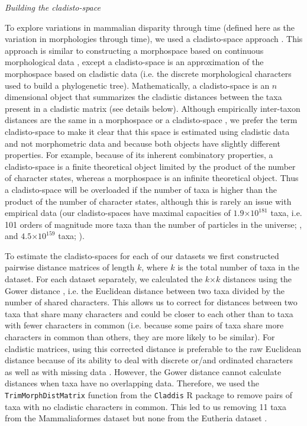 \documentclass[12pt,letterpaper]{article}
\renewcommand{\subsection}[1]{%
\bigskip
\begin{center}
\begin{large}
\normalfont\itshape #1
\end{large}
\end{center}}
\begin{document}
\subsection{Building the cladisto-space}
To explore variations in mammalian disparity through time (defined here as the variation in morphologies through time), we used a cladisto-space approach \citep[e.g.][]{Foote01071994,Foote29111996,Wesley-Hunt2005,Brusatte12092008,friedmanexplosive2010,toljagictriassic-jurassic2013,Hughes20082013}.
This approach is similar to constructing a morphospace based on continuous morphological data \citep[e.g.][]{friedmanexplosive2010}, except a cladisto-space is an approximation of the morphospace based on cladistic data (i.e. the discrete morphological characters used to build a phylogenetic tree).
Mathematically, a cladisto-space is an $n$ dimensional object that summarizes the cladistic distances between the taxa present in a cladistic matrix (see details below).
Although empirically inter-taxon distances are the same in a morphospace or a cladisto-space \citep{foth2012different,hetherington2015cladistic}, we prefer the term cladisto-space to make it clear that this space is estimated using cladistic data and not morphometric data and because both objects have slightly different properties.
For example, because of its inherent combinatory properties, a cladisto-space is a finite theoretical object limited by the product of the number of character states, whereas a morphospace is an infinite theoretical object.
Thus a cladisto-space will be overloaded if the number of taxa is higher than the product of the number of character states, although this is rarely an issue with empirical data (our cladisto-spaces have maximal capacities of $1.9$$\times$$10^{181}$ taxa, i.e. 101 orders of magnitude more taxa than the number of particles in the universe; \citealp{Slater2012MEE}, and $4.5$$\times$$10^{159}$ taxa; \citealp{beckancient2014}).

To estimate the cladisto-spaces for each of our datasets we first constructed pairwise distance matrices of length $k$, where $k$ is the total number of taxa in the dataset. 
For each dataset separately, we calculated the $k$$\times$$k$ distances using the Gower distance \citep{Gower71}, i.e. the Euclidean distance between two taxa divided by the number of shared characters. 
This allows us to correct for distances between two taxa that share many characters and could be closer to each other than to taxa with fewer characters in common (i.e. because some pairs of taxa share more characters in common than others, they are more likely to be similar).
For cladistic matrices, using this corrected distance is preferable to the raw Euclidean distance because of its ability to deal with discrete or/and ordinated characters as well as with missing data \citep{anderson2012using}.
However, the Gower distance cannot calculate distances when taxa have no overlapping data.
Therefore, we used the \texttt{TrimMorphDistMatrix} function from the \texttt{Claddis} R package \citep{Claddis} to remove pairs of taxa with no cladistic characters in common.
This led to us removing 11 taxa from the Mammaliaformes dataset \citep{Slater2012MEE} but none from the Eutheria dataset \citep{beckancient2014}.
\end{document}
